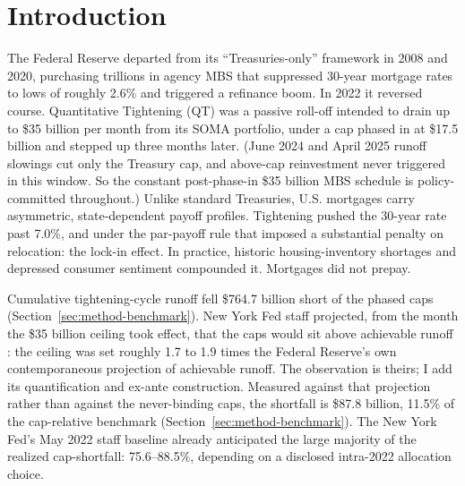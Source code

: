 \section{Introduction}\label{sec:intro}

The Federal Reserve departed from its ``Treasuries-only'' framework in 2008 and 2020, purchasing trillions in agency MBS that suppressed 30-year mortgage rates to lows of roughly 2.6\% \citep{hancock2011} and triggered a refinance boom. In 2022 it reversed course. Quantitative Tightening (QT) was a passive roll-off intended to drain up to \$35 billion per month from its SOMA portfolio, under a cap phased in at \$17.5 billion and stepped up three months later. (June 2024 and April 2025 runoff slowings cut only the Treasury cap, and above-cap reinvestment never triggered in this window. So the constant post-phase-in \$35 billion MBS schedule is policy-committed throughout.) Unlike standard Treasuries, U.S. mortgages carry asymmetric, state-dependent payoff profiles. Tightening pushed the 30-year rate past 7.0\%, and under the par-payoff rule that imposed a substantial penalty on relocation: the lock-in effect. In practice, historic housing-inventory shortages and depressed consumer sentiment compounded it. Mortgages did not prepay.

Cumulative tightening-cycle runoff fell \$764.7 billion short of the phased caps \citep[on the balance-sheet setting, see][]{lopezsalido2023,acharya2023} (Section~\ref{sec:method-benchmark}). New York Fed staff projected, from the month the \$35 billion ceiling took effect, that the caps would sit above achievable runoff \citep{nyfed2022}: the ceiling was set roughly 1.7 to 1.9 times the Federal Reserve's own contemporaneous projection of achievable runoff. The observation is theirs; I add its quantification and ex-ante construction. Measured against that projection rather than against the never-binding caps, the shortfall is \$87.8 billion, 11.5\% of the cap-relative benchmark (Section~\ref{sec:method-benchmark}). The New York Fed's May 2022 staff baseline already anticipated the large majority of the realized cap-shortfall: 75.6--88.5\%, depending on a disclosed intra-2022 allocation choice.

